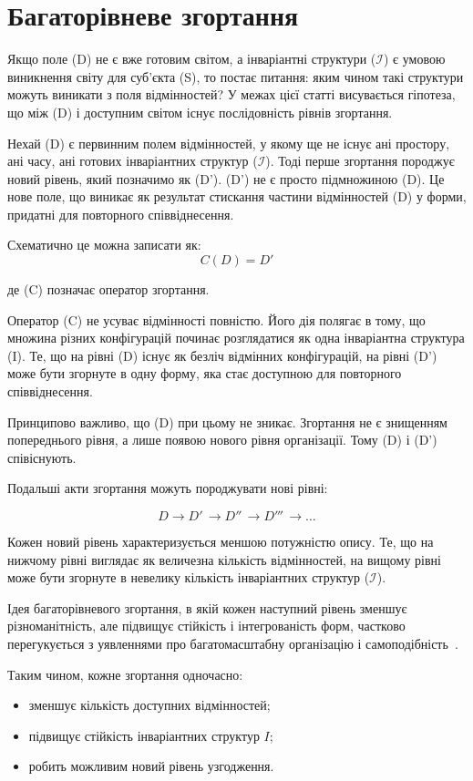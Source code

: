 \documentclass[aps,prd,onecolumn,nofootinbib,superscriptaddress]{revtex4-2} %
\begin{document}
    \section{Багаторівневе згортання}
    Якщо поле (D) не є вже готовим світом, а інваріантні структури ($\mathcal{I}$) є умовою виникнення світу для суб’єкта (S), то постає питання: яким чином такі структури можуть виникати з поля відмінностей? У межах цієї статті висувається гіпотеза, що між (D) і доступним світом існує послідовність рівнів згортання.

    Нехай (D) є первинним полем відмінностей, у якому ще не існує ані простору, ані часу, ані готових інваріантних структур ($\mathcal{I}$). Тоді перше згортання породжує новий рівень, який позначимо як (D'). (D') не є просто підмножиною (D). Це нове поле, що виникає як результат стискання частини відмінностей (D) у форми, придатні для повторного співвіднесення.

    Схематично це можна записати як:
    \[C(D)=D'\]

    де (C) позначає оператор згортання.

    Оператор (C) не усуває відмінності повністю. Його дія полягає в тому, що множина різних конфігурацій починає розглядатися як одна інваріантна структура (I). Те, що на рівні (D) існує як безліч відмінних конфігурацій, на рівні (D') може бути згорнуте в одну форму, яка стає доступною для повторного співвіднесення.

    Принципово важливо, що (D) при цьому не зникає. Згортання не є знищенням попереднього рівня, а лише появою нового рівня організації. Тому (D) і (D') співіснують.

    Подальші акти згортання можуть породжувати нові рівні:

    \[ D \to D'\, \to D''\, \to D'''\, \to \dots \]

    Кожен новий рівень характеризується меншою потужністю опису. Те, що на нижчому рівні виглядає як величезна кількість відмінностей, на вищому рівні може бути згорнуте в невелику кількість інваріантних структур ($\mathcal{I}$).

    Ідея багаторівневого згортання, в якій кожен наступний рівень зменшує різноманітність, але підвищує стійкість і інтегрованість форм, частково перегукується з уявленнями про багатомасштабну організацію і самоподібність~\cite{Mandelbrot1982,Mandelbrot1977}.

    Таким чином, кожне згортання одночасно:
    \begin{itemize}
        \item зменшує кількість доступних відмінностей;
        \item підвищує стійкість інваріантних структур \(I\);
        \item робить можливим новий рівень узгодження.
    \end{itemize}
\end{document}
